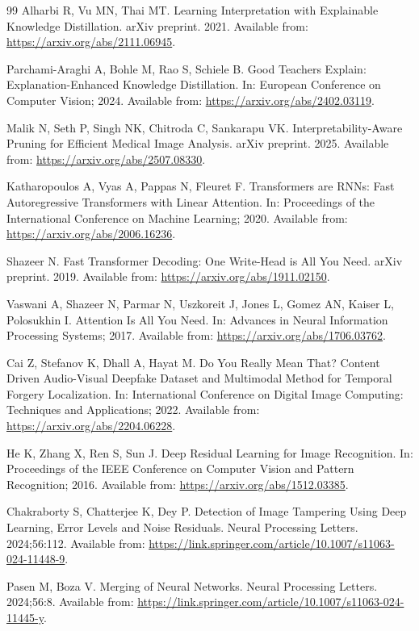 \documentclass[pdflatex,sn-basic,Numbered]{sn-jnl}
\begin{document}
\begin{thebibliography}{99}
Alharbi R, Vu MN, Thai MT. Learning Interpretation with Explainable Knowledge Distillation. arXiv preprint. 2021. Available from: \url{https://arxiv.org/abs/2111.06945}.

Parchami-Araghi A, Bohle M, Rao S, Schiele B. Good Teachers Explain: Explanation-Enhanced Knowledge Distillation. In: European Conference on Computer Vision; 2024. Available from: \url{https://arxiv.org/abs/2402.03119}.

Malik N, Seth P, Singh NK, Chitroda C, Sankarapu VK. Interpretability-Aware Pruning for Efficient Medical Image Analysis. arXiv preprint. 2025. Available from: \url{https://arxiv.org/abs/2507.08330}.

Katharopoulos A, Vyas A, Pappas N, Fleuret F. Transformers are RNNs: Fast Autoregressive Transformers with Linear Attention. In: Proceedings of the International Conference on Machine Learning; 2020. Available from: \url{https://arxiv.org/abs/2006.16236}.

Shazeer N. Fast Transformer Decoding: One Write-Head is All You Need. arXiv preprint. 2019. Available from: \url{https://arxiv.org/abs/1911.02150}.

Vaswani A, Shazeer N, Parmar N, Uszkoreit J, Jones L, Gomez AN, Kaiser L, Polosukhin I. Attention Is All You Need. In: Advances in Neural Information Processing Systems; 2017. Available from: \url{https://arxiv.org/abs/1706.03762}.

Cai Z, Stefanov K, Dhall A, Hayat M. Do You Really Mean That? Content Driven Audio-Visual Deepfake Dataset and Multimodal Method for Temporal Forgery Localization. In: International Conference on Digital Image Computing: Techniques and Applications; 2022. Available from: \url{https://arxiv.org/abs/2204.06228}.

He K, Zhang X, Ren S, Sun J. Deep Residual Learning for Image Recognition. In: Proceedings of the IEEE Conference on Computer Vision and Pattern Recognition; 2016. Available from: \url{https://arxiv.org/abs/1512.03385}.

Chakraborty S, Chatterjee K, Dey P. Detection of Image Tampering Using Deep Learning, Error Levels and Noise Residuals. Neural Processing Letters. 2024;56:112. Available from: \url{https://link.springer.com/article/10.1007/s11063-024-11448-9}.

Pasen M, Boza V. Merging of Neural Networks. Neural Processing Letters. 2024;56:8. Available from: \url{https://link.springer.com/article/10.1007/s11063-024-11445-y}.

\end{thebibliography}
\end{document}
